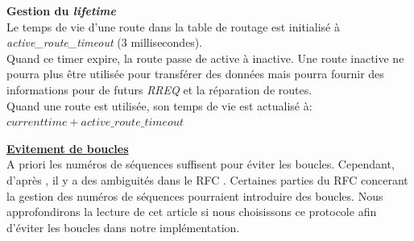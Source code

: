 \documentclass[a4paper, 12pt]{report}
\begin{document}
        \textbf{Gestion du \textit{lifetime}}\\
            Le temps de vie d'une route dans la table de routage est initialisé à \textit{active\_route\_timeout} (3 millisecondes).\\
            Quand ce timer expire, la route passe de active à inactive. Une route inactive ne pourra plus être utilisée pour transférer des données
            mais pourra fournir des informations pour de futurs \textit{RREQ} et la réparation de routes.\\
            Quand une route est utilisée, son temps de vie  est actualisé à: $current time + active\_route\_timeout$


        \underline{\textbf{Evitement de boucles}}\\
            A priori les numéros de séquences suffisent pour éviter les boucles. Cependant, d'après \cite{loop_aodv_w}, il y a des
            ambiguités dans le RFC \cite{aodv_w}. Certaines parties du RFC concerant la gestion des numéros de séquences pourraient introduire
            des boucles. Nous approfondirons la lecture de cet article si nous choisissons ce protocole afin d'éviter les boucles dans notre implémentation.
\end{document}

